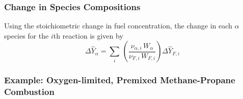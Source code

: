 \subsubsection{Change in Species Compositions}

Using the stoichiometric change in fuel concentration, the change in each $\alpha$ species for the $i$th reaction is given by
\begin{equation}\label{eq:change_alpha}
\Delta \hat{Y}_{\alpha} = \sum_i \,\left(\frac{\nu_{\alpha,i} \,W_{\alpha}}{\nu_{F,i} \,W_{F,i}}\right)\Delta \hat{Y}_{F,i}
\end{equation}

\subsubsection{Example: Oxygen-limited, Premixed Methane-Propane Combustion}

